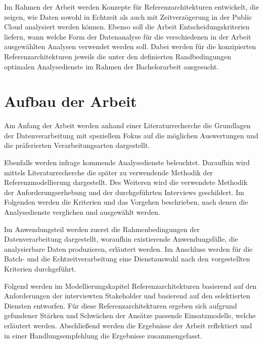 Im Rahmen der Arbeit werden Konzepte für Referenzarchitekturen entwickelt, die zeigen, wie Daten sowohl in Echtzeit als auch mit Zeitverzögerung in der Public Cloud analysiert werden können. 
Ebenso soll die Arbeit Entscheidungskriterien liefern, wann welche Form der Datenanalyse für die verschiedenen in der Arbeit ausgewählten Analysen verwendet werden soll. 
Dabei werden für die konzipierten Referenzarchitekturen jeweils die unter den definierten Randbedingungen optimalen Analysedienste im Rahmen der Bachelorarbeit ausgesucht.


\section{Aufbau der Arbeit}

Am Anfang der Arbeit werden anhand einer Literaturrecherche die Grundlagen der Datenverarbeitung mit speziellem Fokus auf die möglichen Auswertungen und die präferierten Verarbeitungsarten dargestellt. 

Ebenfalls werden infrage kommende Analysedienste beleuchtet. 
Daraufhin wird mittels Literaturrecherche die später zu verwendende Methodik der Referenzmodellierung dargestellt. 
Des Weiteren wird die verwendete Methodik der Anforderungserhebung und der durchgeführten Interviews geschildert. 
Im Folgenden werden die Kriterien und das Vorgehen beschrieben, nach denen die Analysedienste verglichen und ausgewählt werden. 

Im Anwendungsteil werden zuerst die Rahmenbedingungen der Datenverarbeitung dargestellt, woraufhin existierende Anwendungsfälle, die analysierbare Daten produzieren, erläutert werden. 
Im Anschluss werden für die Batch- und die Echtzeitverarbeitung eine Dienstauswahl nach den vorgestellten Kriterien durchgeführt. 

Folgend werden im Modellierungskapitel Referenzarchitekturen basierend auf den Anforderungen der interviewten Stakeholder und basierend auf den selektierten Diensten entworfen. Für diese Referenzarchitekturen ergeben sich aufgrund gefundener Stärken und
Schwächen der Ansätze passende Einsatzmodelle, welche erläutert werden. Abschließend werden die Ergebnisse der Arbeit reflektiert und in einer Handlungsempfehlung die Ergebnisse zusammengefasst.

